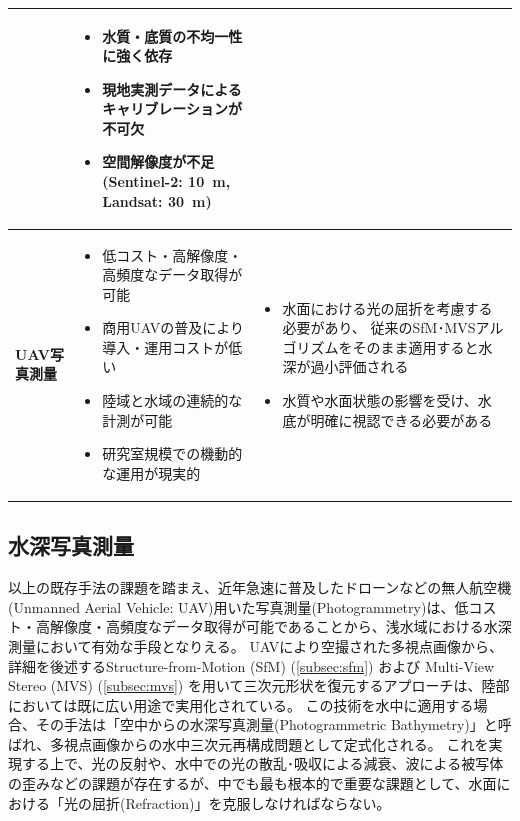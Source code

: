 \begin{table}[htbp]
\begin{tabularx}{\textwidth}{l>{\RaggedRight\arraybackslash}X>{\RaggedRight\arraybackslash}X}
\begin{itemize}[leftmargin=1.2em, nosep, itemsep=0.2em]
    \end{itemize} &
    \begin{itemize}[leftmargin=1.2em, nosep, itemsep=0.2em]
      \item 水質・底質の不均一性に強く依存
      \item 現地実測データによるキャリブレーションが不可欠
      \item 空間解像度が不足(Sentinel-2: \qty{10}{m}, Landsat: \qty{30}{m})
    \end{itemize} \\
    \midrule
    \textbf{UAV写真測量} & 
    \begin{itemize}[leftmargin=1.2em, nosep, itemsep=0.2em]
      \item 低コスト・高解像度・高頻度なデータ取得が可能
      \item 商用UAVの普及により導入・運用コストが低い
      \item 陸域と水域の連続的な計測が可能
      \item 研究室規模での機動的な運用が現実的
    \end{itemize} &
    \begin{itemize}[leftmargin=1.2em, nosep, itemsep=0.2em]
      \item 水面における光の屈折を考慮する必要があり、
      従来のSfM･MVSアルゴリズムをそのまま適用すると水深が過小評価される
      \item 水質や水面状態の影響を受け、水底が明確に視認できる必要がある
    \end{itemize} \\
    \bottomrule
  \end{tabularx}
\end{table}

\subsection{水深写真測量}\label{subsec:bg_photogrammetric-bathymetry-overview}
以上の既存手法の課題を踏まえ、近年急速に普及したドローンなどの無人航空機(Unmanned Aerial Vehicle: UAV)用いた写真測量(Photogrammetry)は、低コスト・高解像度・高頻度なデータ取得が可能であることから、浅水域における水深測量において有効な手段となりえる。
UAVにより空撮された多視点画像から、詳細を後述するStructure-from-Motion (SfM) (\cref{subsec:sfm}) および Multi-View Stereo (MVS) (\cref{subsec:mvs}) を用いて三次元形状を復元するアプローチは、陸部においては既に広い用途で実用化されている\cite{Bemis2014_UAV-photogrammetry,Gomez2016_UAV-photogrammetry-disaster,Iglhaut2019_UAV-photogrammetry-forestry}。
この技術を水中に適用する場合、その手法は「空中からの水深写真測量(Photogrammetric Bathymetry)」と呼ばれ、多視点画像からの水中三次元再構成問題として定式化される。
これを実現する上で、光の反射や、水中での光の散乱･吸収による減衰、波による被写体の歪みなどの課題が存在するが、中でも最も根本的で重要な課題として、水面における「光の屈折(Refraction)」を克服しなければならない。

